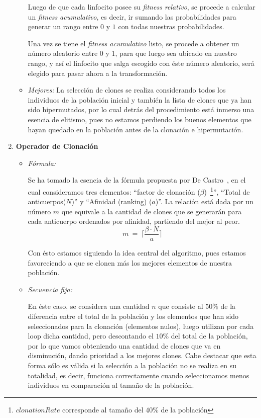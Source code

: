 \begin{enumerate}
\begin{itemize}
				Luego de que cada linfocito posee su \emph{fitness relativo}, se procede a calcular un \emph{fitness acumulativo},
				es decir, ir sumando las probabilidades para generar un rango entre $0$ y $1$ con todas nuestras probabilidades.
					
				Una vez se tiene el \emph{fitness acumulativo} listo, se procede a obtener un número aleatorio entre $0$ y $1$,
				para que luego sea ubicado en nuestro rango, y así el linfocito que salga escogido con éste número aleatorio, será
				elegido para pasar ahora a la transformación.
		
			\item \emph{Mejores:}
				La selección de clones se realiza considerando todos los individuos de la población inicial y también
				la lista de clones que ya han sido hipermutados, por lo cual detrás del procedimiento está inmerso una
				esencia de elitismo, pues no estamos perdiendo los buenos elementos que hayan quedado en la población
				antes de la clonación e hipermutación.

		\end{itemize}
	\item \textbf{Operador de Clonación}
		\begin{itemize}
			\item \emph{Fórmula:}

				Se ha tomado la esencia de la fórmula propuesta por De Castro~\cite{decastro},
				en el cual consideramos tres elementos: ``factor de clonación ($\beta$)~\footnote{$clonationRate$
				corresponde al tamaño del $40\%$ de la población}'', ``Total de anticuerpos($N$)'' y
				``Afinidad (ranking) ($a$)''.
				La relación está dada por un número $m$ que equivale a la cantidad de clones que se generarán
				para cada anticuerpo ordenados por afinidad, partiendo del mejor al peor.
				$$m\ =\ \lceil\frac{\beta \cdot N}{a}\rceil$$

				Con ésto estamos siguiendo la idea central del algoritmo, pues estamos favoreciendo a que se clonen más
				los mejores elementos de nuestra población.
				
			\item \emph{Secuencia fija:}
			
				En éste caso, se considera una cantidad $n$ que consiste al $50\%$ de la diferencia entre el total de la población
				y los elementos que han sido seleccionados para la clonación (elementos nulos), luego utilizan por cada loop
				dicha cantidad, pero descontando el $10\%$ del total de la población, por lo que vamos obteniendo una cantidad
				de clones que va en disminución, dando prioridad a los mejores clones.
				Cabe destacar que esta forma sólo es válida si la selección a la población no se realiza en su totalidad, es decir,
				funciona correctamente cuando seleccionamos menos individuos en comparación al tamaño de la población.
			

\end{itemize}
\end{enumerate}
